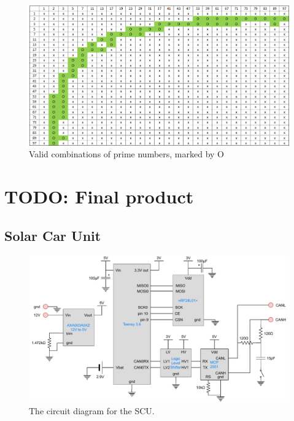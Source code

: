 \documentclass[conference]{IEEEtran}
\newcommand{\todo}[1]{{\color{olive} TODO: #1}}
\begin{document}
\begin{figure}
    \centering
    \includegraphics[width=\linewidth]{documentation/images/prime_tabel.png}
    \caption{Valid combinations of prime numbers, marked by O}
    \label{fig:prime_tabel}
\end{figure}


\section{\todo{Final product}}
\subsection{Solar Car Unit}



\begin{figure}
    \centering
    \includegraphics[width=\linewidth]{documentation/images/SCU_CircuitDiagram.pdf}
    \caption{The circuit diagram for the SCU.}
    \label{fig:SCU_circuit}
\end{figure}
\end{document}
